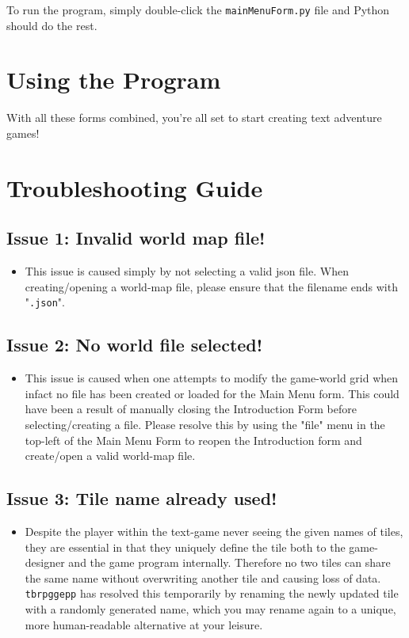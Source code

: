 \documentclass{article} \usepackage[margin=1in,headheight=57pt,headsep=0.1in]{geometry}
\begin{document}
To run the program, simply double-click the \texttt{mainMenuForm.py} file and Python should do the rest.
\newpage
\section{Using the Program}

\newpage

\newpage

\newpage

\newpage

\newpage

With all these forms combined, you're all set to start creating text adventure games!
\newpage
\section{Troubleshooting Guide}
\subsection{Issue 1: Invalid world map file!}
\begin{itemize}
	\item This issue is caused simply by not selecting a valid json file. When creating/opening a world-map file, please ensure that the filename ends with "\texttt{.json}".
\end{itemize}
\subsection{Issue 2: No world file selected!}
\begin{itemize}
	\item This issue is caused when one attempts to modify the game-world grid when infact no file has been created or loaded for the Main Menu form. This could have been a result of manually closing the Introduction Form before selecting/creating a file. Please resolve this by using the "file" menu in the top-left of the Main Menu Form to reopen the Introduction form and create/open a valid world-map file.
\end{itemize}
\subsection{Issue 3: Tile name already used!}
\begin{itemize}
	\item Despite the player within the text-game never seeing the given names of tiles, they are essential in that they uniquely define the tile both to the game-designer and the game program internally. Therefore no two tiles can share the same name without overwriting another tile and causing loss of data. \texttt{tbrpggepp} has resolved this temporarily by renaming the newly updated tile with a randomly generated name, which you may rename again to a unique, more human-readable alternative at your leisure.
\end{itemize}
\end{document}
